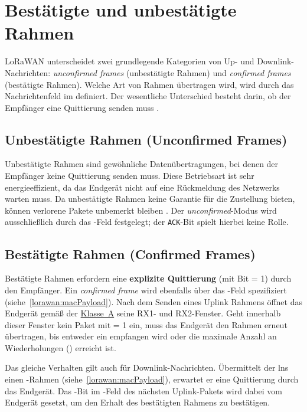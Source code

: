 \section{Bestätigte und unbestätigte Rahmen}
	LoRaWAN unterscheidet zwei grundlegende Kategorien von Up- und Downlink-Nachrichten: \textit{unconfirmed frames} (unbestätigte Rahmen) und \textit{confirmed frames} (bestätigte Rahmen). Welche Art von Rahmen übertragen wird, wird durch das Nachrichtenfeld  im  definiert. Der wesentliche Unterschied besteht darin, ob der Empfänger eine Quittierung senden muss \cite{Montagny:2022, LoRaAlliance:2020b}.

\subsection{Unbestätigte Rahmen (Unconfirmed Frames)}
	Unbestätigte Rahmen sind gewöhnliche Datenübertragungen, bei denen der Empfänger keine Quittierung senden muss. Diese Betriebsart ist sehr energieeffizient, da das Endgerät nicht auf eine Rückmeldung des Netzwerks warten muss. Da unbestätigte Rahmen keine Garantie für die Zustellung bieten, können verlorene Pakete unbemerkt bleiben \cite{Montagny:2022}. Der \textit{unconfirmed}-Modus wird ausschlie{\ss}lich durch das -Feld festgelegt; der \texttt{ACK}-Bit spielt hierbei keine Rolle.

\subsection{Bestätigte Rahmen (Confirmed Frames)}
	Bestätigte Rahmen erfordern eine \textbf{explizite Quittierung} (mit  Bit = 1) durch den Empfänger. Ein \textit{confirmed frame} wird ebenfalls über das -Feld spezifiziert (siehe~\autoref{lorawan:macPayload}). Nach dem Senden eines Uplink Rahmens öffnet das Endgerät gemä{\ss} der \hyperref[lorawan:deviceClassA]{Klasse~A} seine RX1- und RX2-Fenster. Geht innerhalb dieser Fenster kein Paket mit  = 1 ein, muss das Endgerät den Rahmen erneut übertragen, bis entweder ein  empfangen wird oder die maximale Anzahl an Wiederholungen () erreicht ist.

	Das gleiche Verhalten gilt auch für Downlink-Nachrichten. Übermittelt der \ac{lns} einen -Rahmen (siehe~\autoref{lorawan:macPayload}), erwartet er eine Quittierung durch das Endgerät. Das -Bit im -Feld des nächsten Uplink-Pakets wird dabei vom Endgerät gesetzt, um den Erhalt des bestätigten Rahmens zu bestätigen.
	

